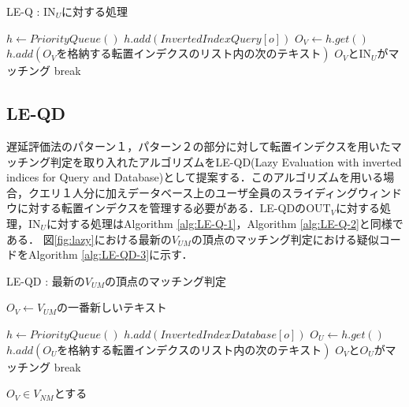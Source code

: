 \begin{algorithm}[H]
    \caption{LE-Q : $\mbox{IN}_U$に対する処理}
    \label{alg:LE-Q-2}
    \begin{algorithmic}[1]
    \State $h \leftarrow PriorityQueue()$
        \State $h.add(InvertedIndexQuery[o])$
    \EndFor
        \State $O_V \leftarrow h.get()$
        \State $h.add(O_Vを格納する転置インデクスのリスト内の次のテキスト)$
                \State $O_V$と$\mbox{IN}_U$がマッチング
                \State break
            \EndIf
        \EndIf
    \EndWhile
    \end{algorithmic}
\end{algorithm}

\subsection{LE-QD}
遅延評価法のパターン１，パターン２の部分に対して転置インデクスを用いたマッチング判定を取り入れたアルゴリズムをLE-QD(Lazy Evaluation with inverted indices for Query and Database)として提案する．このアルゴリズムを用いる場合，クエリ１人分に加えデータベース上のユーザ全員のスライディングウィンドウに対する転置インデクスを管理する必要がある．LE-QDの$\mbox{OUT}_V$に対する処理，$\mbox{IN}_U$に対する処理はAlgorithm \ref{alg:LE-Q-1}，Algorithm \ref{alg:LE-Q-2}と同様である．
図\ref{fig:lazy}における最新の$V_{UM}$の頂点のマッチング判定における疑似コードをAlgorithm \ref{alg:LE-QD-3}に示す．

\begin{algorithm}[H]
    \caption{LE-QD : 最新の$V_{UM}$の頂点のマッチング判定}
    \label{alg:LE-QD-3}
    \begin{algorithmic}[1]
    \State $O_V \leftarrow V_{UM} $の一番新しいテキスト
      
    \State $h \leftarrow PriorityQueue()$
        \State $h.add(InvertedIndexDatabase[o])$
    \EndFor
        \State $O_U \leftarrow h.get()$
        \State $h.add(O_Uを格納する転置インデクスのリスト内の次のテキスト)$
                \State $O_V$と$O_U$がマッチング
                \State break
            \EndIf
        \EndIf
    \EndWhile
      
      \State $O_V\in V_{NM}$とする
    \EndIf
  \EndWhile
    \end{algorithmic}
\end{algorithm}

